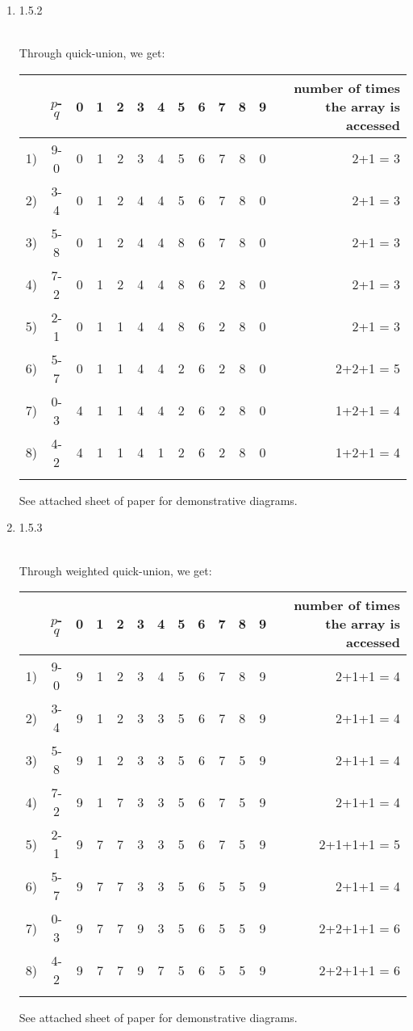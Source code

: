 \documentclass[11pt]{article}
\begin{document}
\begin{enumerate}
\item 1.5.2
\begin{solution}\\
Through quick-union, we get: \\
\begin{tabular}{cc|cccccccccc|r}
& $p$-$q$& 0&1 &2 &3 &4 &5 &6 &7 & 8 & 9 & number of times the array is accessed\\
\hline
1) & 9-0 & 0&1 &2 &3 &4 &5 &6 &7 & 8 & 0 & 2+1 = 3\\
2) & 3-4 & 0&1 &2 &4 &4 &5 &6 &7 & 8 & 0 & 2+1 = 3\\
3) & 5-8 & 0&1 &2 &4 &4 &8 &6 &7 & 8 & 0 & 2+1 = 3\\
4) & 7-2 & 0&1 &2 &4 &4 &8 &6 &2 & 8 & 0 & 2+1 = 3\\
5) & 2-1 & 0&1 &1 &4 &4 &8 &6 &2 & 8 & 0 & 2+1 = 3\\
6) & 5-7 & 0&1 &1 &4 &4 &2 &6 &2 & 8 & 0 & 2+2+1 = 5\\
7) & 0-3 & 4&1 &1 &4 &4 &2 &6 &2 & 8 & 0 & 1+2+1 = 4\\
8) & 4-2 & 4&1 &1 &4 &1 &2 &6 &2 & 8 & 0 & 1+2+1 = 4\\
\\
\end{tabular}
See attached sheet of paper for demonstrative diagrams.

\end{solution}

\item 1.5.3
\begin{solution}\\
Through weighted quick-union, we get: \\
\begin{tabular}{cc|cccccccccc|r}
& $p$-$q$& 0&1 &2 &3 &4 &5 &6 &7 & 8 & 9 & number of times the array is accessed\\
\hline
1) & 9-0 & 9&1 &2 &3 &4 &5 &6 &7 & 8 & 9 & 2+1+1 = 4\\
2) & 3-4 & 9&1 &2 &3 &3 &5 &6 &7 & 8 & 9 & 2+1+1 = 4\\
3) & 5-8 & 9&1 &2 &3 &3 &5 &6 &7 & 5 & 9 & 2+1+1 = 4\\
4) & 7-2 & 9&1 &7 &3 &3 &5 &6 &7 & 5 & 9 & 2+1+1 = 4\\
5) & 2-1 & 9&7 &7 &3 &3 &5 &6 &7 & 5 & 9 & 2+1+1+1 = 5\\
6) & 5-7 & 9&7 &7 &3 &3 &5 &6 &5 & 5 & 9 & 2+1+1 = 4\\
7) & 0-3 & 9&7 &7 &9 &3 &5 &6 &5 & 5 & 9 & 2+2+1+1 = 6\\
8) & 4-2 & 9&7 &7 &9 &7 &5 &6 &5 & 5 & 9 & 2+2+1+1 = 6\\
\\
\end{tabular}
See attached sheet of paper for demonstrative diagrams.
\end{solution}


\end{enumerate}
\end{document}
